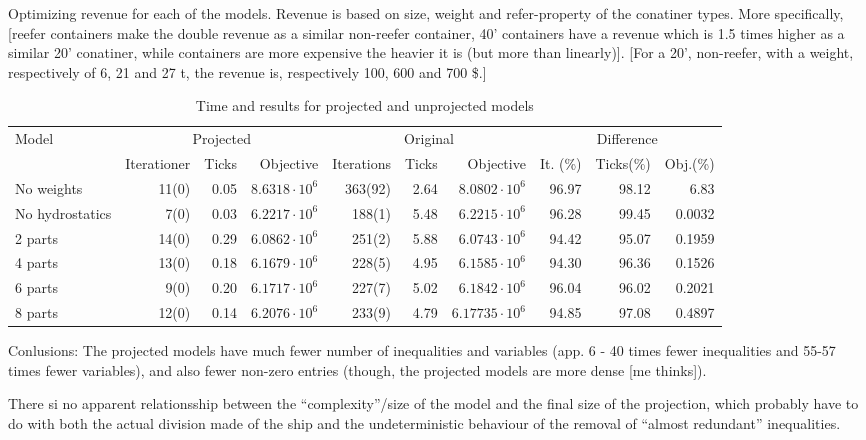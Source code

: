 Optimizing revenue for each of the models. Revenue is based on size, weight and refer-property of the conatiner types. More specifically, [reefer containers make the double revenue as a similar non-reefer container, 40' containers have a revenue which is 1.5 times higher as a similar 20' conatiner, while containers are more expensive the heavier it is (but more than linearly)]. [For a 20', non-reefer, with a weight, respectively of 6, 21 and 27 t, the revenue is, respectively 100, 600 and 700 \$.]   
\begin{table}
\centering
\begin{tabular}{l|rrr|rrr|rrr}
\toprule
Model&\multicolumn{3}{c|}{Projected}&\multicolumn{3}{c}{Original}&\multicolumn{3}{c}{Difference}\\
&Iterationer&Ticks&Objective&Iterations&Ticks&Objective&It. (\%)&Ticks(\%)&Obj.(\%)\\
\midrule
No weights&	11(0) & 0.05 & $8.6318\cdot 10^6$ &	363(92) & 2.64&$8.0802\cdot 10^6$
&96.97&98.12&6.83\\
\midrule
{No hydrostatics}& 7(0) & 0.03 &$6.2217\cdot 10^6$&	188(1) & 5.48&$6.2215 \cdot 10^6$
&96.28&99.45&0.0032\\
\midrule
{2 parts}& 14(0) & 0.29 & $6.0862\cdot 10^6$ &	251(2) & 5.88&$6.0743\cdot 10^6$
&94.42&95.07&0.1959\\
\midrule
{4 parts} &13(0) & 0.18 &$6.1679\cdot 10^6$ & 228(5) & 4.95 &$6.1585\cdot 10^6$
&94.30&96.36&0.1526\\
\midrule
{6 parts} &9(0) & 0.20& $6.1717\cdot 10^6$ &227(7) & 5.02 &$6.1842\cdot 10^6$
&96.04&96.02&0.2021\\
\midrule
{8 parts} &12(0) & 0.14& $6.2076\cdot 10^6$ & 233(9) & 4.79 &$6.17735\cdot 10^6$
&94.85&97.08&0.4897\\
\bottomrule
\end{tabular}
\caption{Time and results for projected and unprojected models }
\label{tab:usingProjections}
\end{table}
Conlusions: 
The projected models have much fewer number of inequalities and variables (app. 6 - 40 times fewer inequalities and 55-57 times fewer variables), and also fewer non-zero entries (though, the projected models are more dense [me thinks]).

There si no apparent relationsship between the ``complexity''/size of the model and the final size of the projection, which probably have to do with both the actual division made of the ship and the undeterministic behaviour of the removal of ``almost redundant'' inequalities. 

